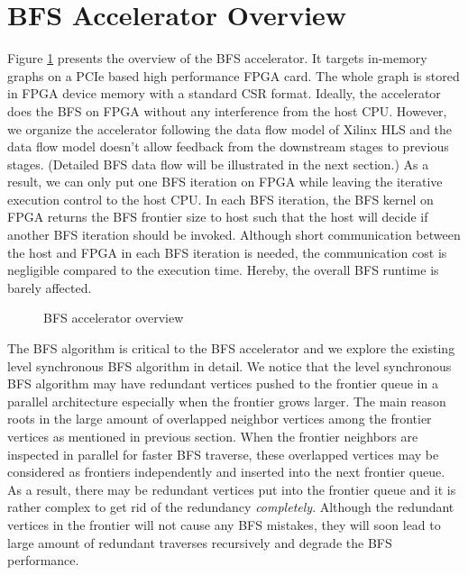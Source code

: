 \section{BFS Accelerator Overview} \label{sec:overview}
Figure \ref{fig:accelerator-overview} presents the overview of 
the BFS accelerator. It targets in-memory graphs on a PCIe based 
high performance FPGA card. The whole graph is stored in FPGA device 
memory with a standard CSR format. 
Ideally, the accelerator does the BFS on FPGA without 
any interference from the host CPU. However, we organize the accelerator 
following the data flow model of Xilinx HLS and the data flow model 
doesn't allow feedback from the downstream stages to previous stages.
(Detailed BFS data flow will be illustrated in the next section.)
As a result, we can only put one BFS iteration on FPGA while 
leaving the iterative execution control to the host CPU. In each BFS iteration, 
the BFS kernel on FPGA returns the BFS frontier size to host such that the host will 
decide if another BFS iteration should be invoked. Although short communication 
between the host and FPGA in each BFS iteration is needed, the communication cost 
is negligible compared to the execution time. Hereby, 
the overall BFS runtime is barely affected.

\begin{figure}
\caption{BFS accelerator overview}
\label{fig:accelerator-overview}
\end{figure}

The BFS algorithm is critical to the BFS accelerator and we explore the 
existing level synchronous BFS algorithm in detail. We notice that 
the level synchronous BFS algorithm may have redundant vertices pushed to the 
frontier queue in a parallel architecture especially when the frontier grows larger.
The main reason roots in the large amount of overlapped neighbor vertices among the 
frontier vertices as mentioned in previous section. When the frontier neighbors 
are inspected in parallel for faster BFS traverse, these overlapped vertices may be 
considered as frontiers independently and inserted into the next frontier queue. 
As a result, there may be redundant vertices put into the frontier queue and it is 
rather complex to get rid of the redundancy \textit{completely}. Although the redundant 
vertices in the frontier will not cause any BFS mistakes, they will soon lead to large 
amount of redundant traverses recursively and degrade the BFS performance.

